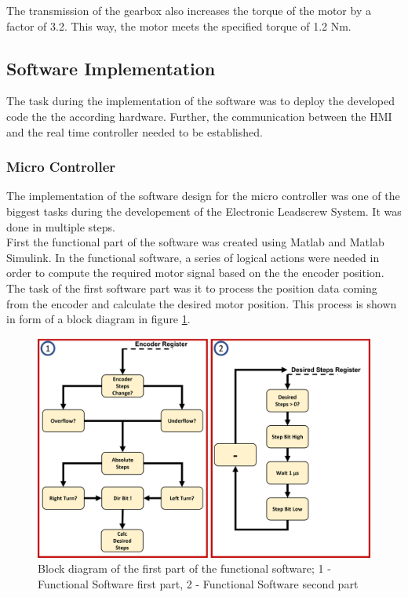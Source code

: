 The transmission of the gearbox also increases the torque of the motor by a factor of 3.2. This way, the motor meets the specified torque of 1.2 Nm.

\subsection{Software Implementation}
The task during the implementation of the software was to deploy the developed code the the according hardware. Further, the communication between the HMI and the real time controller needed to be established.
\subsubsection{Micro Controller}
The implementation of the software design for the micro controller was one of the biggest tasks during the developement of the Electronic Leadscrew System. It was done in multiple steps.\\
First the functional part of the software was created using Matlab and Matlab Simulink. In the functional software, a series of logical actions were needed in order to compute the required motor signal based on the the encoder position.
The task of the first software part was it to process the position data coming from the encoder and calculate the desired motor position. This process is shown in form of a block diagram in figure \ref{Blockdia funcSoft 1}.\\

\begin{figure}
    \begin{center}
    \includegraphics[width=12cm]{Pictures/funcSoft_1.png}
    \caption[Block diagram of the first part of the functional software]{Block diagram of the first part of the functional software; 1 - Functional Software first part, 2 - Functional Software second part}
    \label{Blockdia funcSoft 1}
    \end{center}
\end{figure}

